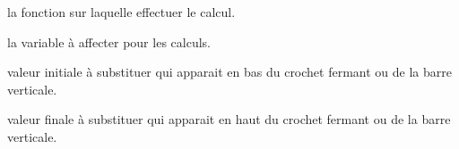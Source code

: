 \documentclass[12pt,a4paper]{article}
\theoremstyle{definition}
\begin{document}
 la fonction sur laquelle effectuer le calcul.

 la variable à affecter pour les calculs.

 valeur initiale à substituer qui apparait en bas du crochet fermant ou de la barre verticale.

 valeur finale à substituer qui apparait en haut du crochet fermant ou de la barre verticale.
\newpage
\end{document}
